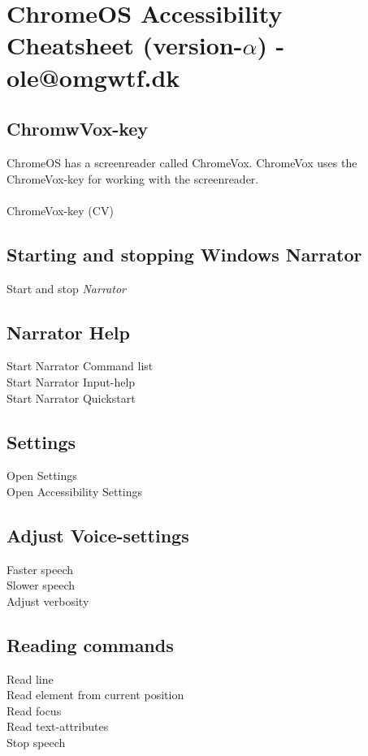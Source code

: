 \documentclass[a4paper, landscape, 11pt]{scrartcl}
\newcommand{\command}[2]{#1~\dotfill{}~#2\\} %
\begin{document}
\section*{ChromeOS Accessibility Cheatsheet (version-$\alpha$) - ole@omgwtf.dk}

\hrulefill{}

\begin{multicols}{2}

\subsection*{ChromwVox-key}
ChromeOS has a screenreader called ChromeVox. ChromeVox uses the ChromeVox-key for working with the screenreader. 
\\ \\
\command{ChromeVox-key (CV)}{\keys{\faSearch} }

\subsection*{Starting and stopping Windows Narrator}
\command{Start and stop \emph{Narrator}}{\keys{$\boxplus$ + \ctrl + \enter}}

\subsection*{Narrator Help}
\command{Start Narrator Command list}{}
\command{Start Narrator Input-help}{}
\command{Start Narrator Quickstart}{}

\subsection*{Settings}
\command{Open Settings}{}
\command{Open Accessibility Settings}{}

\subsection*{Adjust Voice-settings}
\command{Faster speech}{}
\command{Slower speech}{}
\command{Adjust verbosity}{}

\subsection*{Reading commands}
\command{Read line}{}
\command{Read element from current position}{\keys{Na + \arrowkeydown}}
\command{Read focus}{}
\command{Read text-attributes}{}
\command{Stop speech}{\keys{\ctrl}}


\end{multicols}
\end{document}
